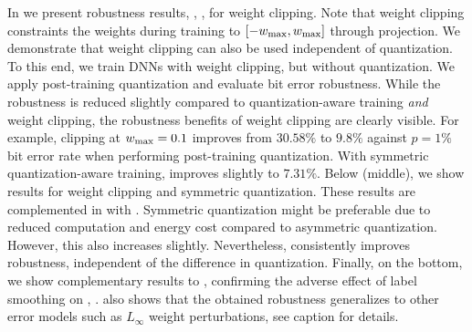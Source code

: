 In  we present robustness results, \ie, \RTE, for weight clipping. Note that weight clipping constraints the weights during training to $[-\wmax, \wmax]$ through projection. We demonstrate that weight clipping can also be used independent of quantization. To this end, we train DNNs with weight clipping, but without quantization. We apply post-training quantization and evaluate bit error robustness. While the robustness is reduced slightly compared to quantization-aware training \emph{and} weight clipping, the robustness benefits of weight clipping are clearly visible. For example, clipping at $\wmax = 0.1$ improves \RTE from $30.58\%$ to $9.8\%$ against $p = 1\%$ bit error rate when performing post-training quantization. With symmetric quantization-aware training, \Clipping[$0.1$] improves slightly to $7.31\%$. Below (middle), we show results for weight clipping and symmetric quantization. These results are complemented in  with \Random. Symmetric quantization might be preferable due to reduced computation and energy cost compared to asymmetric quantization. However, this also increases \RTE slightly. Nevertheless, \Clipping consistently improves robustness, independent of the difference in quantization. Finally, on the bottom, we show complementary results to , confirming the adverse effect of label smoothing \cite{SzegedyCVPR2016} on \RTE, \cf {}.  also shows that the obtained robustness generalizes to other error models such as $L_\infty$ weight perturbations, see caption for details.


